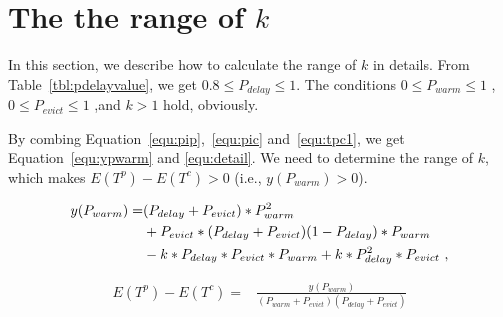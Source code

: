 \newpage
\section{The the range of $k$}
\label{appendixa}
In this section, we describe how to calculate the range of $k$ in details.
From Table~\ref{tbl:pdelayvalue}, we get $0.8 \leq P_{delay} \leq 1$.
The conditions $0 \leq P_{warm} \leq 1$ , $0 \leq P_{evict} \leq 1$ ,and $k > 1$ hold, obviously.

By combing Equation~\ref{equ:pip},~\ref{equ:pic} and~\ref{equ:tpc1}, we get Equation~\ref{equ:ypwarm} and \ref{equ:detail}.
We need to determine the range of  $k$, which makes $E(T^{p}) - E(T^{c})>0$ (i.e., $y(P_{warm}) > 0$).
\begin{footnotesize}
\begin{equation}
\label{equ:ypwarm}
\begin{split}
\scriptsize
y(P_{warm}) = &(P_{delay}+P_{evict})*P_{warm}^{2} \\
& +  P_{evict}*(P_{delay}+P_{evict})(1-P_{delay})*P_{warm}\\
& - k*P_{delay}*P_{evict}*P_{warm}+ k*P_{delay}^{2}*P_{evict} \ ,
\end{split}\end{equation}

\begin{equation}
\label{equ:detail}
\begin{split}
E(T^{p}) - E(T^{c}) = &\frac{y(P_{warm})}{(P_{warm}+P_{evict})(P_{delay}+P_{evict})}
\end{split}\end{equation}
\end{footnotesize}

